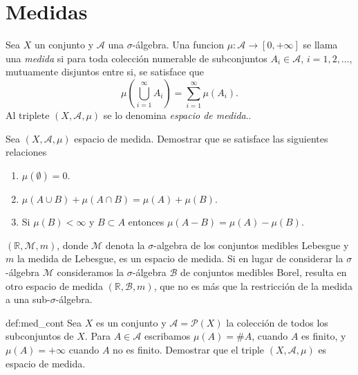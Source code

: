 \section{Medidas} 

\begin{definicion}{} Sea $X$ un conjunto y $\mathscr{A}$ una $\sigma$-álgebra. Una funcion $\mu:\mathscr{A}\to [0,+\infty]$ se llama una \emph{medida} si  para toda colección numerable de subconjuntos $A_i\in\mathscr{A}$, $i=1,2,\ldots$, mutuamente disjuntos entre si, se satisface que 
$$\mu\left(\bigcup_{i=1}^{\infty}A_i\right)=\sum_{i=1}^{\infty}\mu\left(A_i\right).$$
Al triplete $(X,\mathscr{A},\mu)$ se lo denomina \emph{espacio de medida}.. 
\end{definicion}


\begin{ejercicio}{}  Sea $(X,\mathscr{A},\mu)$ espacio de medida. Demostrar que se satisface las siguientes relaciones
\begin{enumerate}
 \item $\mu(\emptyset)=0$.
 \item $\mu(A\cup B)+\mu(A\cap B)=\mu(A)+\mu(B)$.
 \item Si $\mu(B)<\infty$ y $B\subset A$ entonces $\mu(A-B)=\mu(A)-\mu(B)$. 
\end{enumerate}

 
\end{ejercicio}

\begin{ejemplo}{} $(\mathbb{R},\mathscr{M},m)$, donde $\mathscr{M}$ denota la $\sigma$-algebra de los conjuntos medibles Lebesgue y $m$ la medida de Lebesgue, es un espacio de medida. Si en lugar de considerar la $\sigma$-álgebra $\mathscr{M}$ consideramos la $\sigma$-álgebra $\mathscr{B}$ de conjuntos medibles Borel, resulta en otro espacio de medida $(\mathbb{R},\mathscr{B},m)$, que no es más que la restricción de la medida a una sub-$\sigma$-álgebra.
 
\end{ejemplo}


\begin{ejercicio}{def:med_cont} Sea $X$ es un conjunto y $\mathscr{A}=\mathcal{P}(X)$ la colección de todos los subconjuntos de $X$. Para $A\in\mathscr{A}$ escribamos $\mu(A)=\#A$, cuando $A$ es finito, y $\mu(A)=+\infty$ cuando $A$ no es finito. Demostrar que el triple $(X,\mathscr{A},\mu)$ es espacio de medida.
 
\end{ejercicio}
 
